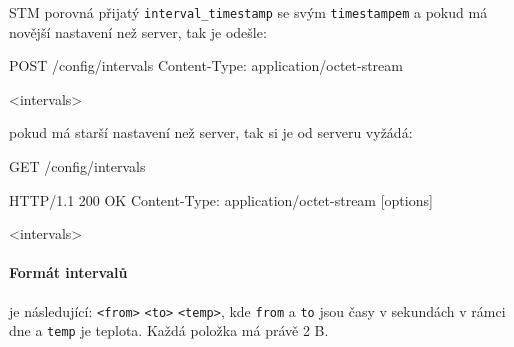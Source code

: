 STM porovná přijatý \texttt{interval\_timestamp} se svým \texttt{timestampem} a pokud má novější nastavení než server,
tak je odešle:
\begin{packetstm}
POST /config/intervals
Content-Type: application/octet-stream

<intervals>
\end{packetstm}

pokud má starší nastavení než server, tak si je od serveru vyžádá:
\begin{packetstm}
GET /config/intervals
\end{packetstm}

\begin{packetserver}
HTTP/1.1 200 OK
Content-Type: application/octet-stream
[options]

<intervals>
\end{packetserver}

\paragraph{Formát intervalů}
je následující:
\texttt{<from>} \texttt{<to>} \texttt{<temp>}, kde \texttt{from} a \texttt{to} jsou
časy v sekundách v rámci dne a \texttt{temp} je teplota.
Každá položka má právě 2 B.
